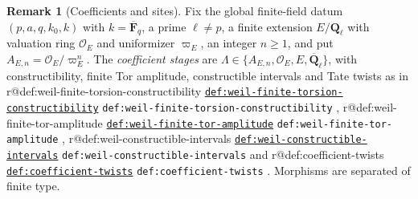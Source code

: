 \documentclass[11pt]{article}
\makeatletter
\theoremstyle{plain}
\theoremstyle{definition}
\newtheorem{remark}[theorem]{Remark}
\newcommand{\up}[1]{%
  \ifcsname r@#1\endcsname
    \hyperref[#1]{\texttt{\scriptsize #1}}%
  \else
    \texttt{\scriptsize #1}%
  \fi}
\newcommand{\uses}[1]{\par\smallskip\noindent{\footnotesize\textit{Uses:}\ #1\par}\smallskip}
\newcommand{\RHom}{R\mathcal Hom_A}
\makeatother
\begin{document}
\begingroup
\sloppy
\setlength{\emergencystretch}{3em}
\newcommand{\Ql}{\mathbf Q_\ell}
\newcommand{\Qlb}{\overline{\mathbf Q}_\ell}
\newcommand{\Proet}{\mathrm{pro\acute{e}t}}
\newcommand{\Dbc}{D^b_c}
\newcommand{\Dctf}{D^b_{ctf}}
\renewcommand{\RHom}{\operatorname{R\mathcal H om}}
\newcommand{\RG}{\operatorname{\mathrm{R}\Gamma}}
\renewcommand{\up}[1]{%
  \ifcsname r@#1\endcsname
    \hyperref[#1]{\textnormal{\scriptsize\nolinkurl{#1}}}%
  \else
    \textnormal{\scriptsize\nolinkurl{#1}}%
  \fi}
\let\sfuses\uses
\renewcommand{\uses}[1]{{\raggedright\sfuses{#1}}}
\newcommand{\prov}[1]{\par\smallskip\noindent{\footnotesize\raggedright\textit{Proved in:}\ #1\par}\smallskip}
\newcommand{\cond}[1]{\par\smallskip\noindent{\footnotesize\raggedright\color{red!60!black}\textsf{\textbf{Conditional on:}}\ #1\par}\smallskip}
\begin{remark}[Coefficients and sites]
\label{def:sf-setting}
Fix the global finite-field datum $(p,a,q,k_0,k)$ with $k=\overline{\mathbf
F}_q$, a prime $\ell\neq p$, a finite extension $E/\Ql$ with valuation ring
$\mathcal O_E$ and uniformizer $\varpi_E$, an integer $n\ge1$, and put
$A_{E,n}=\mathcal O_E/\varpi_E^n$.  The \emph{coefficient stages} are
$\Lambda\in\{A_{E,n},\mathcal O_E,E,\Qlb\}$, with constructibility, finite Tor
amplitude, constructible intervals and Tate twists as in
\up{def:weil-finite-torsion-constructibility},
\up{def:weil-finite-tor-amplitude},
\up{def:weil-constructible-intervals} and \up{def:coefficient-twists}.
Morphisms are separated of finite type.
\end{remark}
\end{document}
